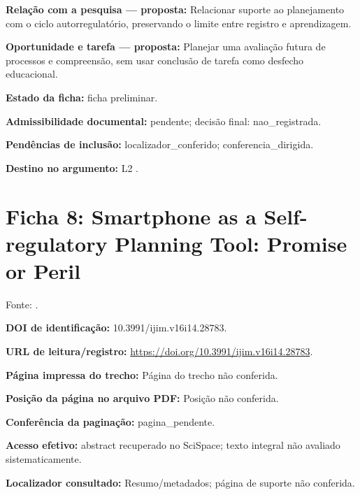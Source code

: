 \noindent\textbf{Relação com a pesquisa — proposta:} Relacionar suporte ao planejamento com o ciclo autorregulatório, preservando o limite entre registro e aprendizagem.\par\medskip

\noindent\textbf{Oportunidade e tarefa — proposta:} Planejar uma avaliação futura de processos e compreensão, sem usar conclusão de tarefa como desfecho educacional.\par\medskip

\noindent\textbf{Estado da ficha:} ficha preliminar.\par\medskip

\noindent\textbf{Admissibilidade documental:} pendente; decisão final: nao\_registrada.\par\medskip

\noindent\textbf{Pendências de inclusão:} localizador\_conferido; conferencia\_dirigida.\par\medskip

\noindent\textbf{Destino no argumento:} L2 .

\clearpage\section*{Ficha 8: Smartphone as a Self-regulatory Planning Tool: Promise or Peril}

Fonte: \citet{education_hartley2022}.

\noindent\textbf{DOI de identificação:} 10.3991/ijim.v16i14.28783.\par\medskip

\noindent\textbf{URL de leitura/registro:} \url{https://doi.org/10.3991/ijim.v16i14.28783}.\par\medskip

\noindent\textbf{Página impressa do trecho:} Página do trecho não conferida.\par\medskip

\noindent\textbf{Posição da página no arquivo PDF:} Posição não conferida.\par\medskip

\noindent\textbf{Conferência da paginação:} pagina\_pendente.\par\medskip

\noindent\textbf{Acesso efetivo:} abstract recuperado no SciSpace; texto integral não avaliado sistematicamente.\par\medskip

\noindent\textbf{Localizador consultado:} Resumo/metadados; página de suporte não conferida.\par\medskip

